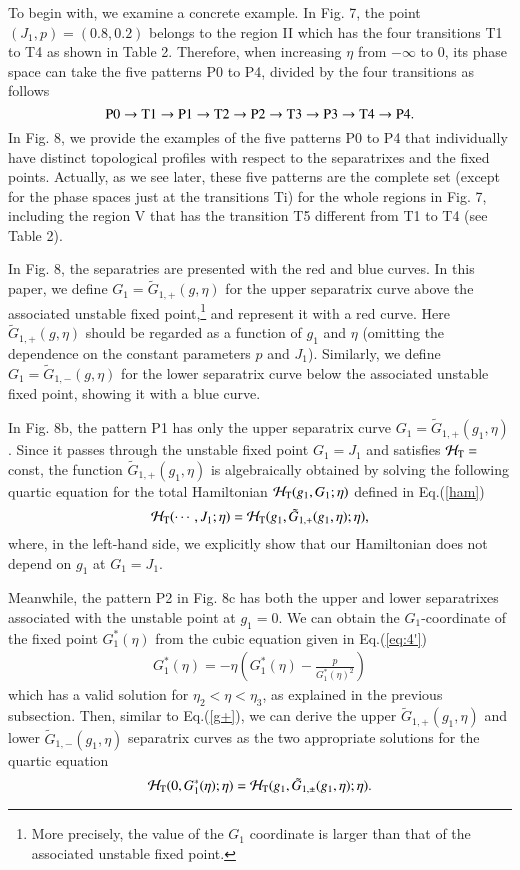 \documentclass[useAMS,usenatbib,twocolumn]{mn2e}
\newcommand{\beq}{\begin{equation}}
\newcommand{\beqa}{\begin{eqnarray}}
\newcommand{\eeq}{\end{equation}}
\newcommand{\eeqa}{\end{eqnarray}}
\newcommand{\lmk}{\left(}
\newcommand{\rmk}{\right)}
\begin{document}
To begin with,  we examine a concrete example. In Fig. 7, the point $(J_1,p)=(0.8,0.2)$ belongs to the region II which has the four transitions T1 to T4  as shown in Table 2. Therefore, when increasing $\eta$ from $-\infty$ to 0, its phase space can take the five patterns P0 to P4, divided by the four transitions as follows
$$
{\rm P0 \to T1 \to P1 \to T2  \to P2  \to T3 \to P3 \to T4  \to P4.}  \nonumber
$$
In Fig. 8, we provide the examples of the five patterns P0 to P4 that individually have distinct topological profiles with respect to the separatrixes and the fixed points. Actually, as we see later, these five patterns are the complete set (except for the phase spaces just at the transitions Ti) for the whole regions in Fig. 7, including the region V that has the transition T5 different from T1 to T4 (see Table 2).


In Fig. 8, the separatries are presented with the red and blue curves.
In this paper, we define $G_1=\tilde{G}_{1, +}(g,\eta)$ for the upper separatrix curve above the associated unstable fixed point,\footnote{More precisely, the value of the $G_1$ coordinate is larger than that of the associated unstable fixed point.} and represent it with a red curve.  Here $\tilde{G}_{1, +}(g,\eta)$ should be regarded as a function of $g_1$ and $\eta$ (omitting the dependence on the constant parameters $p$ and $J_1$).  Similarly, we define $G_1=\tilde{G}_{1, -}(g,\eta)$ for the lower separatrix curve below the associated unstable fixed point, showing it with a blue curve.




In Fig. 8b, the pattern P1  has only the upper separatrix curve  $G_1=\tilde{G}_{1, +}(g_1,\eta)$. Since it passes through the unstable fixed point $G_1=J_1$ and satisfies $\mathcal{H}_{\rm T}=$const, the function $\tilde{G}_{1, +}(g_1,\eta)$ is algebraically obtained by solving the following quartic equation for the total Hamiltonian $\mathcal{H}_{\rm T}(g_1,G_1;\eta)$ defined in Eq.(\ref{ham})
\beq
\mathcal{H}_{\rm T}(\cdots, J_1 ;
\eta)=\mathcal{H}_{\rm T}(g_1, \tilde{G}_{1,+}(g_1,\eta) ; \eta),\label{g+}
\eeq
where, in the left-hand side, we explicitly show that our Hamiltonian does not depend on $g_1$ at $G_1=J_1$. 

Meanwhile, the pattern P2 in Fig. 8c has both the upper and lower separatrixes associated with the unstable point at $g_1=0$.
We can obtain the $G_1$-coordinate of the fixed point $G_1^*(\eta)$ from the cubic equation given in Eq.(\ref{eq:4'})
\beqa
G_1^*(\eta)=-\eta\lmk G_1^*(\eta)-\frac{p}{{G_{1}^*}(\eta)^{2}}\rmk
\eeqa
which has a valid solution for $\eta_2<\eta<\eta_3$, as explained in the previous subsection. 
Then, similar to Eq.(\ref{g+}), we can derive the upper $\tilde{G}_{1, +}(g_1,\eta)$ and lower $\tilde{G}_{1, -}(g_1,\eta)$ separatrix curves as the two appropriate solutions for the quartic equation
\beq
\mathcal{H}_{\rm T}(0, G_1^*(\eta) ;
\eta)=\mathcal{H}_{\rm T}(g_1, \tilde{G}_{1,\pm}(g_1,\eta) ; \eta).
\eeq
\end{document}
